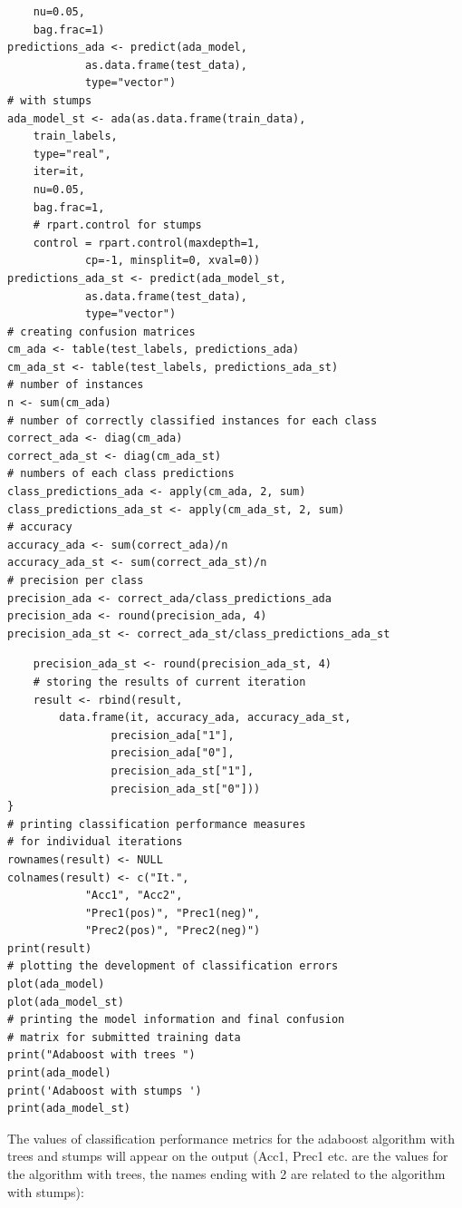\documentclass[10pt]{book}
\begin{document}
\begin{verbatim}
    nu=0.05,
    bag.frac=1)
predictions_ada <- predict(ada_model,
            as.data.frame(test_data),
            type="vector")
# with stumps
ada_model_st <- ada(as.data.frame(train_data),
    train_labels,
    type="real",
    iter=it,
    nu=0.05,
    bag.frac=1,
    # rpart.control for stumps
    control = rpart.control(maxdepth=1,
            cp=-1, minsplit=0, xval=0))
predictions_ada_st <- predict(ada_model_st,
            as.data.frame(test_data),
            type="vector")
# creating confusion matrices
cm_ada <- table(test_labels, predictions_ada)
cm_ada_st <- table(test_labels, predictions_ada_st)
# number of instances
n <- sum(cm_ada)
# number of correctly classified instances for each class
correct_ada <- diag(cm_ada)
correct_ada_st <- diag(cm_ada_st)
# numbers of each class predictions
class_predictions_ada <- apply(cm_ada, 2, sum)
class_predictions_ada_st <- apply(cm_ada_st, 2, sum)
# accuracy
accuracy_ada <- sum(correct_ada)/n
accuracy_ada_st <- sum(correct_ada_st)/n
# precision per class
precision_ada <- correct_ada/class_predictions_ada
precision_ada <- round(precision_ada, 4)
precision_ada_st <- correct_ada_st/class_predictions_ada_st
\end{verbatim}

\begin{verbatim}
    precision_ada_st <- round(precision_ada_st, 4)
    # storing the results of current iteration
    result <- rbind(result,
        data.frame(it, accuracy_ada, accuracy_ada_st,
                precision_ada["1"],
                precision_ada["0"],
                precision_ada_st["1"],
                precision_ada_st["0"]))
}
# printing classification performance measures
# for individual iterations
rownames(result) <- NULL
colnames(result) <- c("It.",
            "Acc1", "Acc2",
            "Prec1(pos)", "Prec1(neg)",
            "Prec2(pos)", "Prec2(neg)")
print(result)
# plotting the development of classification errors
plot(ada_model)
plot(ada_model_st)
# printing the model information and final confusion
# matrix for submitted training data
print("Adaboost with trees ")
print(ada_model)
print('Adaboost with stumps ')
print(ada_model_st)
\end{verbatim}

The values of classification performance metrics for the adaboost algorithm with trees and stumps will appear on the output (Acc1, Prec1 etc. are the values for the algorithm with trees, the names ending with 2 are related to the algorithm with stumps):
\end{document}
